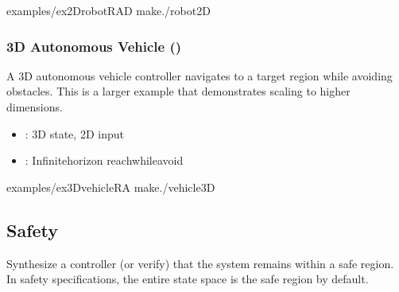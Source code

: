 \documentclass[a4paper,10pt,english]{sphinxmanual}
\let\sphinxpxdimen\pdfpxdimen\else\newdimen\sphinxpxdimen
\begin{document}
\sphinxAtStartPar
{}

\begin{sphinxVerbatim}[commandchars=\\\{\}]
examples/ex\PYGZus{}2Drobot\PYGZhy{}RA\PYGZhy{}D
make./robot2D
\end{sphinxVerbatim}


\subsubsection{3D Autonomous Vehicle ()}
\label{\detokenize{examples/reach-avoid:d-autonomous-vehicle-ex-3dvehicle-ra}}
\noindent{\hspace*{\fill}\sphinxincludegraphics[width=400\sphinxpxdimen]{{fig1}.png}\hspace*{\fill}}

\sphinxAtStartPar
A 3D autonomous vehicle controller navigates to a target region while avoiding
obstacles. This is a larger example that demonstrates scaling to higher dimensions.

\sphinxAtStartPar
{}
\begin{itemize}
\item {} 
\sphinxAtStartPar
{}: 3D state, 2D input

\item {} 
\sphinxAtStartPar
{}: Infinite\sphinxhyphen{}horizon reach\sphinxhyphen{}while\sphinxhyphen{}avoid

\end{itemize}

\sphinxAtStartPar
{}

\begin{sphinxVerbatim}[commandchars=\\\{\}]
examples/ex\PYGZus{}3Dvehicle\PYGZhy{}RA
make./vehicle3D
\end{sphinxVerbatim}

\sphinxstepscope


\subsection{Safety}
\label{\detokenize{examples/safety:safety}}\label{\detokenize{examples/safety::doc}}
\sphinxAtStartPar
Synthesize a controller (or verify) that the system remains within a safe region.
In safety specifications, the entire state space is the safe region by default.
\end{document}
